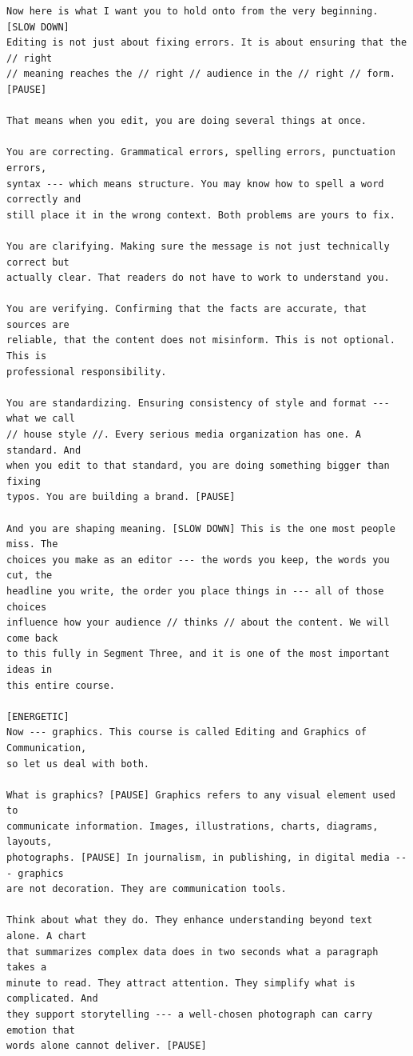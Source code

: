 {\begin{Verbatim}
Now here is what I want you to hold onto from the very beginning. [SLOW DOWN]
Editing is not just about fixing errors. It is about ensuring that the // right
// meaning reaches the // right // audience in the // right // form. [PAUSE]

That means when you edit, you are doing several things at once.

You are correcting. Grammatical errors, spelling errors, punctuation errors,
syntax --- which means structure. You may know how to spell a word correctly and
still place it in the wrong context. Both problems are yours to fix.

You are clarifying. Making sure the message is not just technically correct but
actually clear. That readers do not have to work to understand you.

You are verifying. Confirming that the facts are accurate, that sources are
reliable, that the content does not misinform. This is not optional. This is
professional responsibility.

You are standardizing. Ensuring consistency of style and format --- what we call
// house style //. Every serious media organization has one. A standard. And
when you edit to that standard, you are doing something bigger than fixing
typos. You are building a brand. [PAUSE]

And you are shaping meaning. [SLOW DOWN] This is the one most people miss. The
choices you make as an editor --- the words you keep, the words you cut, the
headline you write, the order you place things in --- all of those choices
influence how your audience // thinks // about the content. We will come back
to this fully in Segment Three, and it is one of the most important ideas in
this entire course.

[ENERGETIC]
Now --- graphics. This course is called Editing and Graphics of Communication,
so let us deal with both.

What is graphics? [PAUSE] Graphics refers to any visual element used to
communicate information. Images, illustrations, charts, diagrams, layouts,
photographs. [PAUSE] In journalism, in publishing, in digital media --- graphics
are not decoration. They are communication tools.

Think about what they do. They enhance understanding beyond text alone. A chart
that summarizes complex data does in two seconds what a paragraph takes a
minute to read. They attract attention. They simplify what is complicated. And
they support storytelling --- a well-chosen photograph can carry emotion that
words alone cannot deliver. [PAUSE]


\end{Verbatim}}

